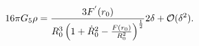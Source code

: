 \begin{equation}
16\pi G_{5}\rho =
\frac{3F^{'}(r_{0})}{R^3_{0}\left(1+\dot{R}^2_{0}
-\frac{F(r_{0})}{R_{0}^2} \right)^\frac{1}{2}}2\delta + {\cal
O}(\delta^2).
\end{equation}

